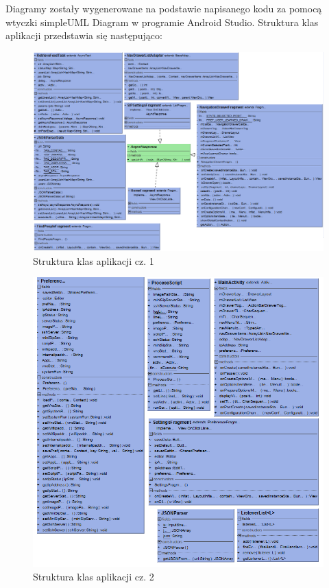 Diagramy zostały wygenerowane na podstawie napisanego kodu za pomocą wtyczki simpleUML Diagram w programie Android Studio. Struktura klas aplikacji przedstawia się następująco: 

\begin{figure}[H]
	\centering
	\includegraphics[width=1.1\linewidth]{uml1}
	\caption{Struktura klas aplikacji cz. 1}
	\label{fig:uml1}
\end{figure} 
\begin{figure}[H]
\centering
\includegraphics[width=1.1\linewidth]{uml2}
\caption{Struktura klas aplikacji cz. 2}
\label{fig:uml2}
\end{figure}
